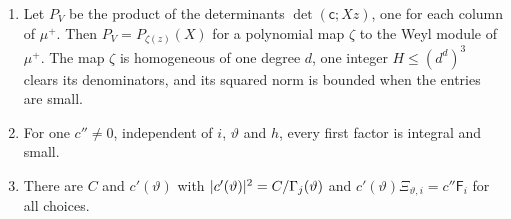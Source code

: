 \begin{proposition}\label{prop:first-factors}
\begin{enumerate}[label=\textup{(\alph*)}]
\item Let $P_V$ be the product of the determinants $\det(\mathsf c;Xz)$, one for each column of $\mu^+$. Then $P_V=P_{\zeta(z)}(X)$ for a polynomial map $\zeta$ to the Weyl module of $\mu^+$. The map $\zeta$ is
homogeneous of one degree $d$, one integer $H\le(d^d)^3$ clears its denominators, and its squared norm is bounded when the entries are small.
\item For one $c''\ne0$, independent of $i$, $\vartheta$ and $h$, every first factor is integral and small.
\item There are $C$ and $c'(\vartheta)$ with $\lvert c'(\vartheta)\rvert^2=C/\Gamma_j(\vartheta)$ and $c'(\vartheta)\Xi_{\vartheta,i}=c''\mathsf F_i$ for all choices.
\end{enumerate}
\end{proposition}


